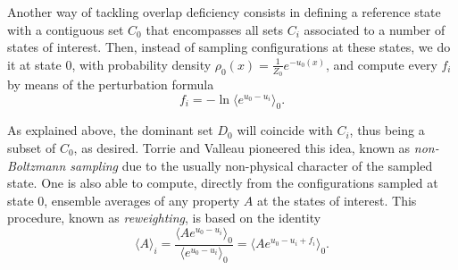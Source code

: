 \documentclass[aip,jcp,reprint,amsmath,amssymb]{revtex4-1}
\begin{document}
Another way of tackling overlap deficiency consists in defining a reference state with a contiguous set $C_0$ that encompasses all sets $C_i$ associated to a number of states of interest. Then, instead of sampling configurations at these states, we do it at state $0$, with probability density $\rho_0(x) = \frac{1}{Z_0} e^{-u_0(x)}$, and compute every $f_i$ by means of the perturbation formula
\begin{equation}
\label{eq:nbs sampling free energy}
f_i = -\ln \langle e^{u_0-u_i} \rangle_0.
\end{equation}

As explained above, the dominant set $D_0$ will coincide with $C_i$, thus being a subset of $C_0$, as desired. Torrie and Valleau\cite{Torrie_1977} pioneered this idea, known as \textit{non-Boltzmann sampling} due to the usually non-physical character of the sampled state. One is also able to compute, directly from the configurations sampled at state $0$, ensemble averages of any property $A$ at the states of interest. This procedure, known as \textit{reweighting}, is based on the identity\cite{Torrie_1977}
\begin{equation}
\label{eq:nbs sampling reweighting}
\langle A \rangle_i = \frac{\langle A e^{u_0 - u_i} \rangle_0}{\langle e^{u_0 - u_i} \rangle_0} = \langle A e^{u_0 - u_i + f_i} \rangle_0.
\end{equation}
\end{document}
